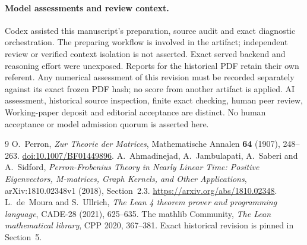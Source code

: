 \documentclass[11pt]{article}
\begin{document}
\paragraph{Model assessments and review context.}
Codex assisted this manuscript's preparation, source audit and exact diagnostic
orchestration. The preparing workflow is involved in the artifact; independent
review or verified context isolation is not asserted. Exact served backend and
reasoning effort were unexposed. Reports for the historical PDF retain their
own referent. Any numerical assessment of this revision must be recorded
separately against its exact frozen PDF hash; no score from another artifact
is applied. AI assessment, historical source inspection, finite exact checking,
human peer review, Working-paper deposit and editorial acceptance are distinct.
No human acceptance or model admission quorum is asserted here.

\begin{thebibliography}{9}
O.~Perron, \emph{Zur Theorie der Matrices},
Mathematische Annalen \textbf{64} (1907), 248--263.
\href{https://doi.org/10.1007/BF01449896}{doi:10.1007/BF01449896}.
A.~Ahmadinejad, A.~Jambulapati, A.~Saberi and A.~Sidford,
\emph{Perron-Frobenius Theory in Nearly Linear Time: Positive Eigenvectors,
M-matrices, Graph Kernels, and Other Applications}, arXiv:1810.02348v1 (2018),
Section~2.3. \url{https://arxiv.org/abs/1810.02348}.
L.~de~Moura and S.~Ullrich,
\emph{The Lean 4 theorem prover and programming language}, CADE-28 (2021), 625--635.
The mathlib Community, \emph{The Lean mathematical library},
CPP 2020, 367--381. Exact historical revision is pinned in Section~5.
\end{thebibliography}
\end{document}
